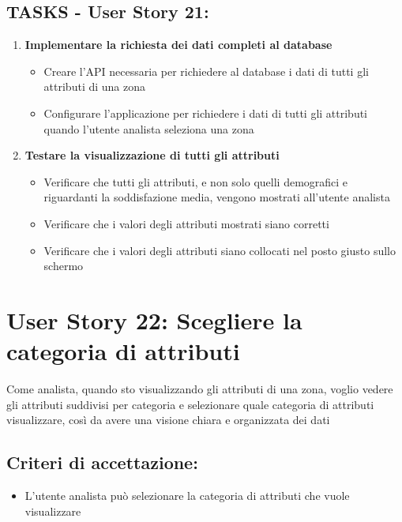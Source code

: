     \subsection*{TASKS - User Story 21:}  
    \begin{enumerate}  
        \item \textbf{Implementare la richiesta dei dati completi al database}  
            \begin{itemize}  
                \item Creare l'API necessaria per richiedere al database i dati di tutti gli attributi di una zona
                \item Configurare l'applicazione per richiedere i dati di tutti gli attributi quando l'utente analista seleziona una zona
            \end{itemize} 
        \item \textbf{Testare la visualizzazione di tutti gli attributi}  
            \begin{itemize}  
                \item Verificare che tutti gli attributi, e non solo quelli demografici e riguardanti la soddisfazione media, vengono mostrati all'utente analista
                \item Verificare che i valori degli attributi mostrati siano corretti
                \item Verificare che i valori degli attributi siano collocati nel posto giusto sullo schermo
            \end{itemize} 
    \end{enumerate}
\section*{User Story 22: Scegliere la categoria di attributi}
    Come analista, quando sto visualizzando gli attributi di una zona, voglio vedere gli attributi suddivisi per categoria e selezionare quale categoria di attributi visualizzare, così da avere una visione chiara e organizzata dei dati
    \subsection*{Criteri di accettazione:}  
    \begin{itemize}  
        \item L'utente analista può selezionare la categoria di attributi che vuole visualizzare
    \end{itemize}  
